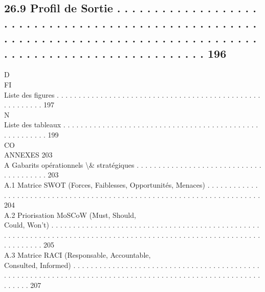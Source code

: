 \subsection{26.9    Profil de Sortie . . . . . . . . . . . . . . . . . . . . . . . . . . . . . . . . . . . . . . . . . . . . . . . . . . . . . . . . . . . . . . . . . . . . . . . . . . . . . . . . . . . . . . . . . . . . . . . . . . . . . . . . . . . . . . . . . . 196}
\vspace{0.5em}
\vspace{0.5em}
\vspace{0.5em}
\vspace{0.5em}
D\\
FI\\
Liste des figures . . . . . . . . . . . . . . . . . . . . . . . . . . . . . . . . . . . . . . . . . . . . . . . . . . . . . . . . 197\\
\vspace{0.5em}
N\\
Liste des tableaux . . . . . . . . . . . . . . . . . . . . . . . . . . . . . . . . . . . . . . . . . . . . . . . . . . . . . . . 199\\
CO\\
ANNEXES                                                                                                                                                                                                                                                      203\\
A     Gabarits opérationnels \textbackslash{}& stratégiques . . . . . . . . . . . . . . . . . . . . . . . . . . . . . . . . . . . . . . . 203\\
A.1     Matrice SWOT (Forces, Faiblesses, Opportunités, Menaces) . . . . . . . . . . . . . . . . . . . . . . . . . . . . . . . . . . . . . . . . . . . . . . . . . . . . . . . . . . . . . . . . . . . . . . . 204\\
A.2     Priorisation MoSCoW (Must, Should,\\
Could, Won’t) . . . . . . . . . . . . . . . . . . . . . . . . . . . . . . . . . . . . . . . . . . . . . . . . . . . . . . . . . . . . . . . . . . . . . . . . . . . . . . . . . . . . . . . . . . . . . . . . . . . . . . . . . . . . . . . . . . . . 205\\
A.3     Matrice RACI (Responsable, Accountable,\\
Consulted, Informed) . . . . . . . . . . . . . . . . . . . . . . . . . . . . . . . . . . . . . . . . . . . . . . . . . . . . . . . . . . . . . . . . . . . . . . . . . . . . . . . . . . . . . . . . . . . . . . . . . . . . . . . . . . . . 207\\
